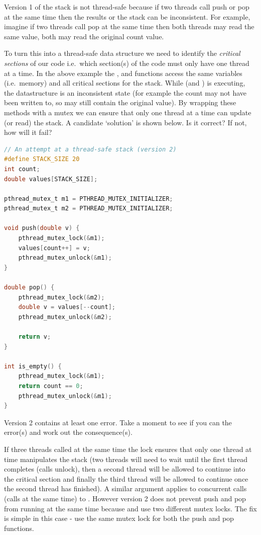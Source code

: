 Version 1 of the stack is not thread-safe because if two threads call push or pop at the same time then the results or the stack can be inconsistent.
For example, imagine if two threads call pop at the same time then both threads may read the same value, both may read the original count value.

To turn this into a thread-safe data structure we need to identify the \emph{critical sections} of our code i.e.~which section(s) of the code must only have one thread at a time.
In the above example the , and  functions access the same variables (i.e.~memory) and all critical sections for the stack.
While  (and ) is executing, the datastructure is an inconsistent state (for example the count may not have been written to, so may still contain the original value).
By wrapping these methods with a mutex we can ensure that only one thread at a time can update (or read) the stack. A candidate `solution' is shown below.
Is it correct? If not, how will it fail?

\begin{lstlisting}[language=C]
// An attempt at a thread-safe stack (version 2)
#define STACK_SIZE 20
int count;
double values[STACK_SIZE];

pthread_mutex_t m1 = PTHREAD_MUTEX_INITIALIZER;
pthread_mutex_t m2 = PTHREAD_MUTEX_INITIALIZER;

void push(double v) { 
    pthread_mutex_lock(&m1);
    values[count++] = v;
    pthread_mutex_unlock(&m1);
}

double pop() {
    pthread_mutex_lock(&m2);
    double v = values[--count];
    pthread_mutex_unlock(&m2);

    return v;
}

int is_empty() {
    pthread_mutex_lock(&m1);
    return count == 0;
    pthread_mutex_unlock(&m1);
}
\end{lstlisting}

Version 2 contains at least one error.
Take a moment to see if you can the error(s) and work out the consequence(s).

If three threads called  at the same time the lock  ensures that only one thread at time manipulates the stack (two threads will need to wait until the first thread completes (calls unlock), then a second thread will be allowed to continue into the critical section and finally the third thread will be allowed to continue once the second thread has finished).
A similar argument applies to concurrent calls (calls at the same time) to . However version 2 does not prevent push and pop from running at the same time because  and  use two different mutex locks. The fix is simple in this case - use the same mutex lock for both the push and pop functions.

